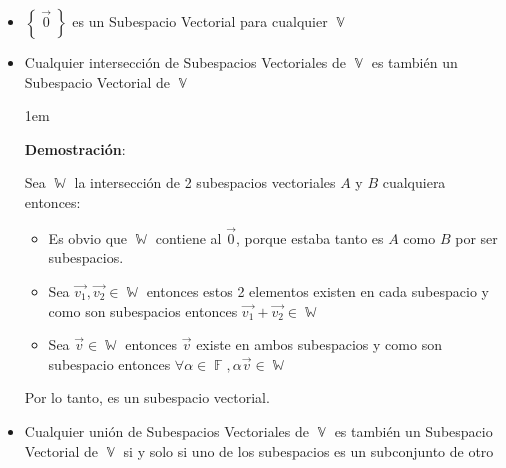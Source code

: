 \documentclass[12pt, fleqn]{report}                             %
\newenvironment{SmallIndentation}[1][0.75em]                    %
        {\begin{adjustwidth}{#1}{}\begin{footnotesize}}             %
        {\end{footnotesize}\end{adjustwidth}}                       %
\theoremstyle{break}                                            %
\DeclareMathOperator \GenericField {\mathbb{F}}                 %
\DeclareMathOperator \VectorSet    {\mathbb{V}}                 %
\DeclareMathOperator \SubVectorSet {\mathbb{W}}                 %
\newcommand{\Set}[1]    {\left\{ \; #1 \; \right\}}             %
\begin{document}
            \begin{itemize}
                
                \item 
                    $\Set{ \vec{0} }$ es un Subespacio Vectorial para cualquier $\VectorSet$

                \item
                    Cualquier intersección de Subespacios Vectoriales de $\VectorSet$ es también un
                    Subespacio Vectorial de $\VectorSet$

                    \begin{SmallIndentation}[1em]
                        \textbf{Demostración}:
                        
                        Sea $\SubVectorSet$ la intersección de 2 subespacios vectoriales $A$ y $B$ cualquiera
                        entonces:

                        \begin{itemize}
                            \item Es obvio que $\SubVectorSet$ contiene al $\vec{0}$, porque estaba tanto
                                es $A$ como $B$ por ser subespacios.

                            \item Sea $\vec{v_1}, \vec{v_2} \in \SubVectorSet$ entonces estos 2 elementos
                                existen en cada subespacio y como son subespacios entonces 
                                $\vec{v_1} + \vec{v_2} \in \SubVectorSet$

                            \item Sea $\vec{v} \in \SubVectorSet$ entonces $\vec{v}$ existe en ambos subespacios
                                y como son subespacio entonces 
                                $\forall \alpha \in \GenericField, \alpha \vec{v} \in \SubVectorSet$

                        \end{itemize}

                        Por lo tanto, es un subespacio vectorial.
                    
                    \end{SmallIndentation}

                \item
                    Cualquier unión de Subespacios Vectoriales de $\VectorSet$ es también un
                    Subespacio Vectorial de $\VectorSet$ si y solo si uno de los subespacios
                    es un subconjunto de otro                        

            \end{itemize}
\end{document}
